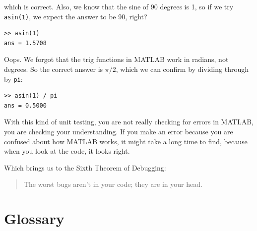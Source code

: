 \documentclass{book}
\begin{document}
which is correct.  Also, we know that the sine of 90 degrees is
1, so if we try {\tt asin(1)}, we expect the answer to be 90, right?

\begin{verbatim}
>> asin(1)
ans = 1.5708
\end{verbatim}

Oops.  We forgot that the trig functions in MATLAB work in radians,
not degrees.  So the correct answer is $\pi/2$, which we can
confirm by dividing through by {\tt pi}:

\begin{verbatim}
>> asin(1) / pi
ans = 0.5000
\end{verbatim}

With this kind of unit testing, you are not really checking for
errors in MATLAB, you are checking your understanding.  If you
make an error because you are confused about how MATLAB works, it
might take a long time to find, because when you look at the code,
it looks right. 

Which brings us to the Sixth Theorem of Debugging:

\begin{quote}
The worst bugs aren't in your code; they are in your head.
\end{quote}



\section{Glossary}
\end{document}
